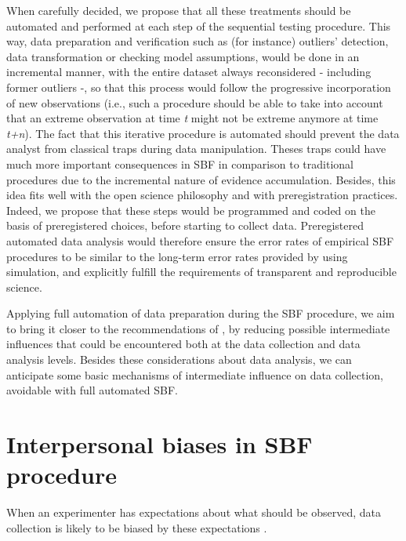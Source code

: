 \documentclass[a4paper,man,natbib,floatsintext,donotrepeattitle]{apa6}
\begin{document}
When carefully decided, we propose that all these treatments should be automated and performed at each step of the sequential testing procedure. This way, data preparation and verification such as (for instance) outliers' detection, data transformation or checking model assumptions, would be done in an incremental manner, with the entire dataset always reconsidered - including former outliers -, so that this process would follow the progressive incorporation of new observations (i.e., such a procedure should be able to take into account that an extreme observation at time \textit{t} might not be extreme anymore at time \textit{t+n}). The fact that this iterative procedure is automated should prevent the data analyst from classical traps during data manipulation. Theses traps could have much more important consequences in SBF in comparison to traditional procedures due to the incremental nature of evidence accumulation. Besides, this idea fits well with the open science philosophy and with preregistration practices. Indeed, we propose that these steps would be programmed and coded on the basis of preregistered choices, before starting to collect data. Preregistered automated data analysis would therefore ensure the error rates of empirical SBF procedures to be similar to the long-term error rates provided by \cite{schonbrodt_sequential_2017} using simulation, and explicitly fulfill the requirements of transparent and reproducible science. \par

Applying full automation of data preparation during the SBF procedure, we aim to bring it closer to the recommendations of \cite{schonbrodt_sequential_2017}, by reducing possible intermediate influences that could be encountered both at the data collection and data analysis levels. Besides these considerations about data analysis, we can anticipate some basic mechanisms of intermediate influence on data collection, avoidable with full automated SBF.

\section{Interpersonal biases in SBF procedure}

When an experimenter has expectations about what should be observed, data collection is likely to be biased by these expectations \citep{orne_social_1962,rosenthal_social_1963,rosenthal_experimenter_1964,rosenthal_interpersonal_1978,zoble_interaction_1969,klein_low_2012,gilder_role_2018}.
\end{document}
